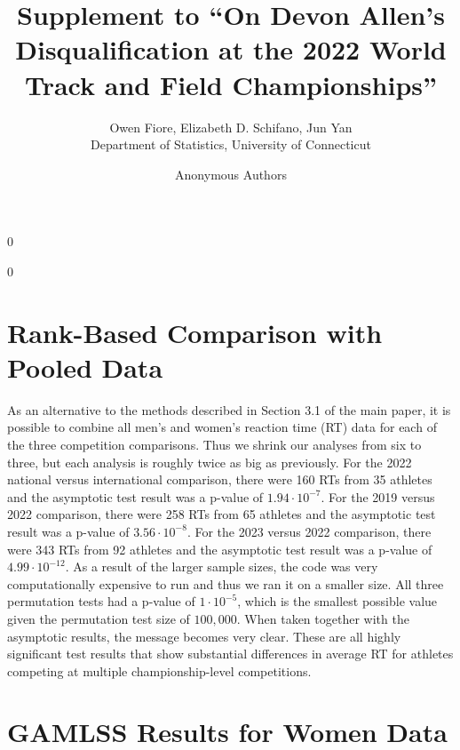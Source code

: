 \documentclass[12pt, letterpaper]{article}
\newcommand{\blind}{0}
\begin{document}
\title{\bf Supplement to ``On Devon Allen's Disqualification at the 2022 World Track and Field Championships''}

\blind
{
  \author{Owen Fiore, %
  Elizabeth D. Schifano, %
  Jun Yan\\[1ex]
  Department of Statistics, University of Connecticut\\
}
} \fi

\blind
{
  \bigskip
  \bigskip
  \bigskip
  \author{Anonymous Authors}
  \bigskip
} \fi

\maketitle 

\section{Rank-Based Comparison with Pooled Data}

As an alternative to the methods described in Section 3.1 of the main paper, it
is possible to combine all men's and women's reaction time (RT) data for each of 
the three competition
comparisons.  Thus we shrink our analyses from six to three, but each analysis
is roughly twice as big as previously.
For the 2022 national versus
international comparison, there were 160 RTs from 35
athletes and the asymptotic test result was a p-value of $1.94 \cdot 10^{-7}$.
For the 2019 versus 2022 comparison,
there were 258 RTs from 65 athletes and the asymptotic
test result was a p-value of $3.56 \cdot 10^{-8}$. 
For the 2023 versus 2022 comparison, there were 343 RTs
from 92 athletes and the asymptotic test result was a p-value of
$4.99 \cdot 10^{-12}$.  As a result of the larger sample sizes, the code was
very computationally expensive to run and thus we ran it on a smaller size.  All
three permutation tests had a p-value of $1 \cdot 10^{-5}$, which is the smallest
possible value given the permutation test size of $100,000$.  When taken together
with the asymptotic results, the message becomes very clear. These are all
highly significant test results that show substantial differences in average RT
for athletes competing at multiple championship-level competitions.


\section{GAMLSS Results for Women Data}
\end{document}
